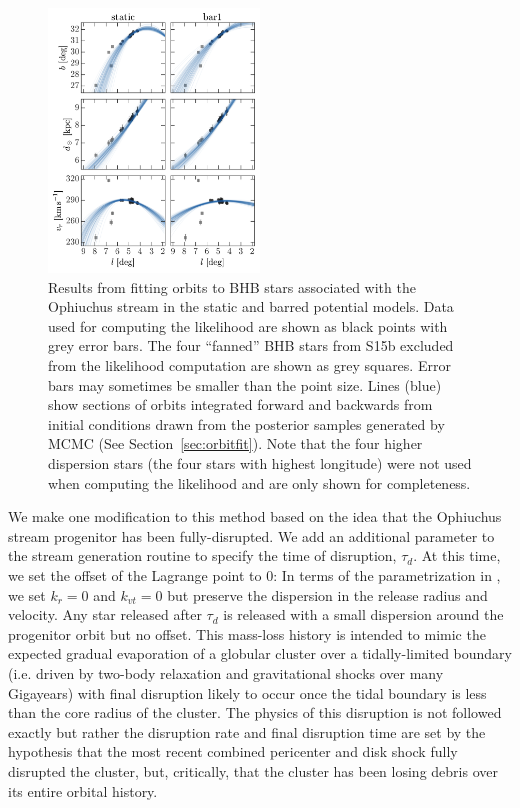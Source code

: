\documentclass[letterpaper,12pt,preprint]{aastex}
\begin{document}
\begin{figure}[!tbp]
\begin{center}
\includegraphics[width=0.5\textwidth]{figures/orbitfits}
\caption{ Results from fitting orbits to BHB stars associated with the Ophiuchus stream in the static and barred potential models. Data used for computing the likelihood are shown as black points with grey error bars. The four ``fanned'' BHB stars from S15b excluded from the likelihood computation are shown as grey squares. Error bars may sometimes be smaller than the point size. Lines (blue) show sections of orbits integrated forward and backwards from initial conditions drawn from the posterior samples generated by MCMC (See Section~\ref{sec:orbitfit}). Note that the four higher dispersion stars (the four stars with highest longitude) were not used when computing the likelihood and are only shown for completeness. }
\label{fig:orbitfits}
\end{center}
\end{figure}

We make one modification to this method based on the idea that the Ophiuchus stream progenitor has been fully-disrupted. We add an additional parameter to the stream generation routine to specify the time of disruption, $\tau_d$. At this time, we set the offset of the Lagrange point to 0: In terms of the parametrization in \citep{fardal14}, we set $k_r = 0$ and $k_{vt}=0$ but preserve the dispersion in the release radius and velocity. Any star released after $\tau_d$ is released with a small dispersion around the progenitor orbit but no offset. This mass-loss history is intended to mimic the expected gradual evaporation of a globular cluster over a tidally-limited boundary (i.e. driven by two-body relaxation and gravitational shocks over many Gigayears) with final disruption likely to occur once the tidal boundary is less than the core radius of the cluster. The physics of this disruption is not followed exactly but rather the disruption rate and final disruption time are set by the hypothesis that the most recent combined pericenter and disk shock fully disrupted the cluster, but, critically, that the cluster has been losing debris over its entire orbital history.
\end{document}
